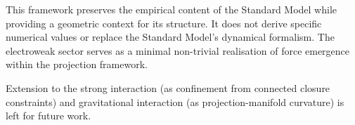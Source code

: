 \documentclass[12pt]{article}
\begin{document}
This framework preserves the empirical content of the Standard Model while providing a geometric context for its structure. It does not derive specific numerical values or replace the Standard Model's dynamical formalism. The electroweak sector serves as a minimal non-trivial realisation of force emergence within the projection framework.

Extension to the strong interaction (as confinement from connected closure constraints) and gravitational interaction (as projection-manifold curvature) is left for future work.



\end{document}
